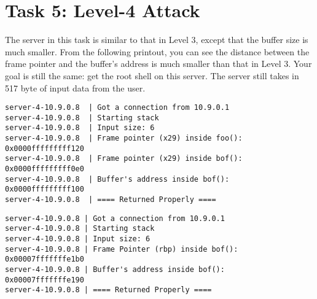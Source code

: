 \section{Task 5: Level-4 Attack} 

The server in this task is similar to that in Level 3, 
except that the buffer size is much smaller. From the 
following printout, you can see the distance between 
the frame pointer and the buffer's address is much 
smaller than that in Level 3. Your goal is still the same: 
get the root shell on this server. The server still takes in
517 byte of input data from the user.

\ifdefined\arm
\begin{lstlisting}
server-4-10.9.0.8  | Got a connection from 10.9.0.1
server-4-10.9.0.8  | Starting stack
server-4-10.9.0.8  | Input size: 6
server-4-10.9.0.8  | Frame pointer (x29) inside foo():  0x0000fffffffff120
server-4-10.9.0.8  | Frame pointer (x29) inside bof():  0x0000fffffffff0e0
server-4-10.9.0.8  | Buffer's address inside bof():     0x0000fffffffff100
server-4-10.9.0.8  | ==== Returned Properly ====
\end{lstlisting}

\else
\begin{lstlisting}
server-4-10.9.0.8 | Got a connection from 10.9.0.1
server-4-10.9.0.8 | Starting stack
server-4-10.9.0.8 | Input size: 6
server-4-10.9.0.8 | Frame Pointer (rbp) inside bof():  0x00007fffffffe1b0
server-4-10.9.0.8 | Buffer's address inside bof():     0x00007fffffffe190
server-4-10.9.0.8 | ==== Returned Properly ====
\end{lstlisting}
\fi 
